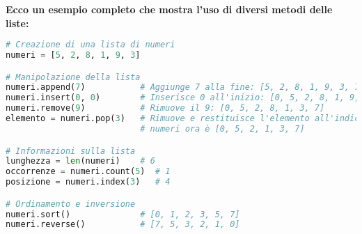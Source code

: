 \textbf{Ecco un esempio completo che mostra l'uso di diversi metodi delle liste:}

\begin{lstlisting}[language=Python]
# Creazione di una lista di numeri
numeri = [5, 2, 8, 1, 9, 3]

# Manipolazione della lista
numeri.append(7)           # Aggiunge 7 alla fine: [5, 2, 8, 1, 9, 3, 7]
numeri.insert(0, 0)        # Inserisce 0 all'inizio: [0, 5, 2, 8, 1, 9, 3, 7]
numeri.remove(9)           # Rimuove il 9: [0, 5, 2, 8, 1, 3, 7]
elemento = numeri.pop(3)   # Rimuove e restituisce l'elemento all'indice 3 (8)
                           # numeri ora è [0, 5, 2, 1, 3, 7]

# Informazioni sulla lista
lunghezza = len(numeri)    # 6
occorrenze = numeri.count(5)  # 1
posizione = numeri.index(3)   # 4

# Ordinamento e inversione
numeri.sort()              # [0, 1, 2, 3, 5, 7]
numeri.reverse()           # [7, 5, 3, 2, 1, 0]
\end{lstlisting}